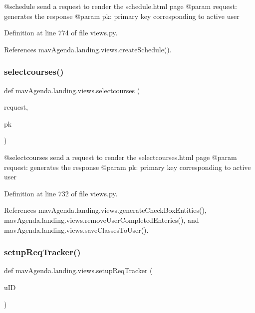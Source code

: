 \begin{DoxyVerb}@schedule send a request to render the schedule.html page
@param request: generates the response
@param pk: primary key corresponding to active user
\end{DoxyVerb}
 

Definition at line 774 of file views.\+py.



References mav\+Agenda.\+landing.\+views.\+create\+Schedule().

\mbox{\label{namespacemavAgenda_1_1landing_1_1views_a55d61c1738704e1297aa54c9c26fc31d}} 
\subsubsection{\texorpdfstring{selectcourses()}{selectcourses()}}
{\footnotesize\ttfamily def mav\+Agenda.\+landing.\+views.\+selectcourses (\begin{DoxyParamCaption}\item[{}]{request,  }\item[{}]{pk }\end{DoxyParamCaption})}

\begin{DoxyVerb}@selectcourses send a request to render the selectcourses.html page
@param request: generates the response
@param pk: primary key corresponding to active user
\end{DoxyVerb}
 

Definition at line 732 of file views.\+py.



References mav\+Agenda.\+landing.\+views.\+generate\+Check\+Box\+Entities(), mav\+Agenda.\+landing.\+views.\+remove\+User\+Completed\+Enteries(), and mav\+Agenda.\+landing.\+views.\+save\+Classes\+To\+User().

\mbox{\label{namespacemavAgenda_1_1landing_1_1views_a070695b43494f3b578bfdda9b8316a42}} 
\subsubsection{\texorpdfstring{setup\+Req\+Tracker()}{setupReqTracker()}}
{\footnotesize\ttfamily def mav\+Agenda.\+landing.\+views.\+setup\+Req\+Tracker (\begin{DoxyParamCaption}\item[{}]{u\+ID }\end{DoxyParamCaption})}

